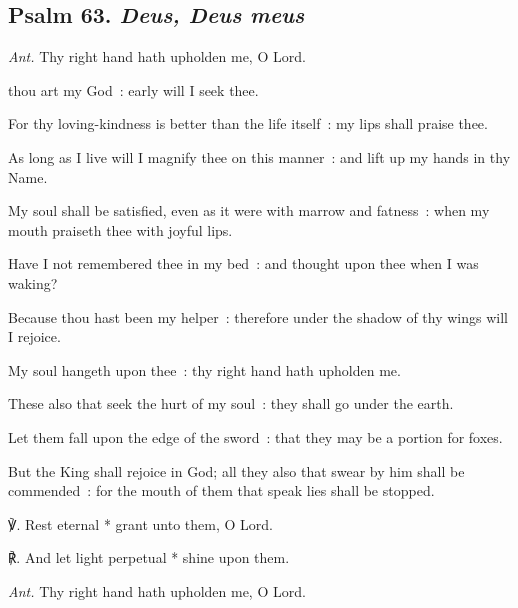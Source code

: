 \subsection{Psalm 63. \textit{Deus, Deus meus}}\par\noindent
\textit{Ant.} Thy right hand {\dag} hath upholden me, O Lord.\par
{} thou art my God~: early will I seek thee.\par
{}
For thy loving-kindness is better than the life itself~: my lips shall praise thee.\par
{}As long as I live will I magnify thee on this manner~: and lift up my hands in thy Name.\par
{}My soul shall be satisfied, even as it were with marrow and fatness~: when my mouth praiseth thee with joyful lips.\par
{}Have I not remembered thee in my bed~: and thought upon thee when I was waking?\par
{}Because thou hast been my helper~: therefore under the shadow of thy wings will I rejoice.\par
{}My soul hangeth upon thee~: thy right hand hath upholden me.\par
{}These also that seek the hurt of my soul~: they shall go under the earth.\par
{}Let them fall upon the edge of the sword~: that they may be a portion for foxes.\par
{}But the King shall rejoice in God; all they also that swear by him shall be commended~: for the mouth of them that speak lies shall be stopped.\par
℣. Rest eternal * grant unto them, O Lord.\par
℟. And let light perpetual * shine upon them.\par\noindent
\textit{Ant.} Thy right hand hath upholden me, O Lord.

